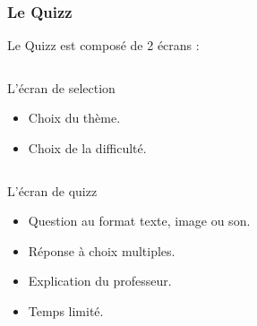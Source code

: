 \begin{frame}
  \frametitle{Le Quizz}
  Le Quizz est composé de 2 écrans :
  \begin{columns}[t]
    \begin{column}{10cm}
      \begin{exampleblock}{L'écran de selection}
	\begin{itemize}
        \item Choix du thème.
        \item Choix de la difficulté.
        \end{itemize}
      \end{exampleblock} 
    \end{column}
  \end{columns}  

  \begin{columns}[t]
    \begin{column}{10cm}
      \begin{exampleblock}{L'écran de quizz}
	\begin{itemize}
        \item Question au format texte, image ou son.
        \item Réponse à choix multiples.
        \item Explication du professeur.
        \item Temps limité.
        \end{itemize}
      \end{exampleblock} 
    \end{column}
  \end{columns}  
\end{frame}

